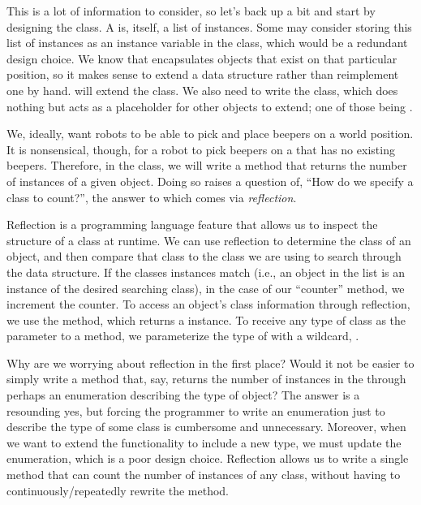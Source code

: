 This is a lot of information to consider, so let's back up a bit and start by designing the  class. A  is, itself, a list of  instances. Some may consider storing this list of instances as an instance variable in the class, which would be a redundant design choice. We know that  encapsulates objects that exist on that particular position, so it makes sense to extend a data structure rather than reimplement one by hand.  will extend the  class. We also need to write the  class, which does nothing but acts as a placeholder for other objects to extend; one of those being .

We, ideally, want robots to be able to pick and place beepers on a world position. It is nonsensical, though, for a robot to pick beepers on a  that has no existing beepers. Therefore, in the  class, we will write a method that returns the number of instances of a given object. Doing so raises a question of, ``How do we specify a class to count?'', the answer to which comes via \textit{reflection}. 

Reflection is a programming language feature that allows us to inspect the structure of a class at runtime. We can use reflection to determine the class of an object, and then compare that class to the class we are using to search through the data structure. If the classes instances match (i.e., an object in the list is an instance of the desired searching class), in the case of our ``counter'' method, we increment the counter. To access an object's class information through reflection, we use the  method, which returns a  instance. To receive any type of class as the parameter to a method, we parameterize the type of  with a wildcard, .

Why are we worrying about reflection in the first place? Would it not be easier to simply write a method that, say, returns the number of  instances in the  through perhaps an enumeration describing the type of object? The answer is a resounding yes, but forcing the programmer to write an enumeration just to describe the type of some class is cumbersome and unnecessary. Moreover, when we want to extend the functionality to include a new type, we must update the enumeration, which is a poor design choice. Reflection allows us to write a single method that can count the number of instances of any class, without having to continuously/repeatedly rewrite the method.

